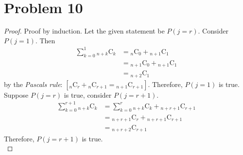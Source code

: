 \section*{Problem 10}
	\begin{proof}
		Proof by induction. Let the given statement be $P(j = r)$. Consider $P(j = 1)$. Then
		\begin{align*}
			\sum\limits_{k=0}^{1} {_{n + k}\mathrm{C}_{k}} &= {_{n}\mathrm{C}_{0}} + {_{n + 1}\mathrm{C}_{1}}\\
			&= {_{n + 1}\mathrm{C}_{0}} + {_{n + 1}\mathrm{C}_{1}}\\
			&= {_{n + 2}\mathrm{C}_{1}}
		\end{align*}
		by the \textit{Pascal\textquotesingle s rule}: $\left[{_{n}\mathrm{C}_{r}} + {_{n}\mathrm{C}_{r + 1}} = {_{n + 1}\mathrm{C}_{r + 1}}\right]$. Therefore, $P(j = 1)$ is true.\\
		Suppose $P(j = r)$ is true, consider $P(j = r + 1)$.
		\begin{align*}
			\sum\limits_{k=0}^{r + 1} {_{n + k}\mathrm{C}_{k}} &= \sum\limits_{k=0}^{r} {_{n + k}\mathrm{C}_{k}} + {_{n + r + 1}\mathrm{C}_{r + 1}}\\
			&= {_{n + r + 1}\mathrm{C}_{r}} + {_{n + r + 1}\mathrm{C}_{r + 1}}\\
			&= {_{n + r + 2}\mathrm{C}_{r + 1}}
		\end{align*}
		Therefore, $P(j = r + 1)$ is true.\\
	\end{proof}